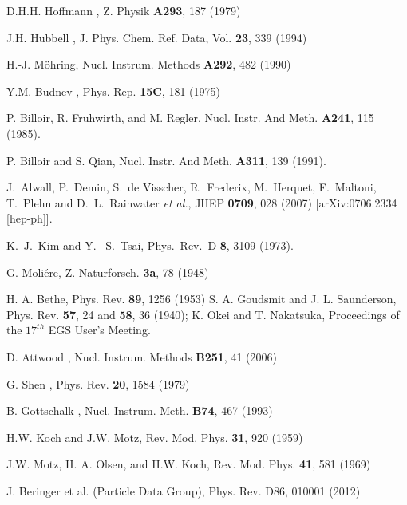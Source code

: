 \begin{thebibliography}{999}
%
D.H.H. Hoffmann \etal, Z. Physik {\bf A293}, 187 (1979)

J.H. Hubbell \etal, J. Phys. Chem. Ref. Data, Vol. {\bf 23}, 339 (1994) 

 H.-J. M\"{o}hring, Nucl. Instrum. Methods {\bf A292}, 482 (1990)

 Y.M. Budnev \etal, Phys. Rep. {\bf 15C}, 181 (1975)

P. Billoir, R. Fruhwirth, and M. Regler, Nucl. Instr. And Meth. {\bf A241}, 115 (1985). 

P. Billoir and S. Qian, Nucl. Instr. And Meth. {\bf A311}, 139 (1991). 


  J.~Alwall, P.~Demin, S.~de Visscher, R.~Frederix, M.~Herquet, F.~Maltoni, T.~Plehn and D.~L.~Rainwater {\it et al.},
  JHEP {\bf 0709}, 028 (2007)
  [arXiv:0706.2334 [hep-ph]].
  
  
  K.~J.~Kim and Y.~-S.~Tsai,
  Phys.\ Rev.\ D {\bf 8}, 3109 (1973).

%
G. Moli\'{e}re, Z. Naturforsch. {\bf 3a}, 78 (1948)

H. A. Bethe, Phys. Rev. {\bf 89}, 1256 (1953)
S. A. Goudsmit and J. L. Saunderson, Phys. Rev. {\bf 57}, 24 and {\bf 58}, 36 (1940);
K. Okei and T. Nakatsuka, Proceedings of the $17^{th}$ EGS User's Meeting.

D. Attwood \etal, Nucl. Instrum. Methods {\bf B251}, 41 (2006)

G. Shen \etal, Phys. Rev. {\bf 20}, 1584 (1979)

B. Gottschalk \etal, Nucl. Instrum. Meth. {\bf B74}, 467 (1993)

H.W. Koch and J.W. Motz, Rev. Mod. Phys. {\bf 31}, 920 (1959)

J.W. Motz, H. A. Olsen, and H.W. Koch, Rev. Mod. Phys. {\bf 41}, 581 (1969)

J. Beringer et al. (Particle Data Group), Phys. Rev. D86, 010001 (2012) 

	               
\end{thebibliography} 